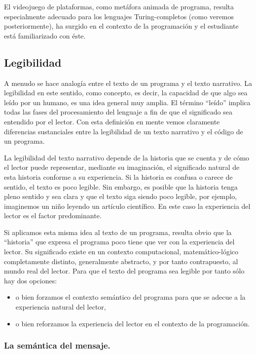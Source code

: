 \documentclass{llncs}
\begin{document}
El videojuego de plataformas, como metáfora animada de programa, resulta especialmente adecuado para los lenguajes Turing-completos (como veremos posteriormente), ha surgido en el contexto de la programación y el estudiante está familiarizado con éste.

\subsection{Legibilidad}
\label{subsec:readability}
A menudo se hace analogía entre el texto de un programa y el texto narrativo. La legibilidad en este sentido, como concepto, es decir, la capacidad de que algo sea leído por un humano, es una idea general muy amplia. El término ``leído'' implica todas las fases del procesamiento del lenguaje a fin de que el significado sea entendido por el lector. Con esta definición en mente vemos claramente diferencias sustanciales entre la legibilidad de un texto narrativo y el código de un programa. 

La legibilidad del texto narrativo depende de la historia que se cuenta y de cómo el lector puede representar, mediante su imaginación, el significado natural de esta historia conforme a su experiencia. Si la historia es confusa o carece de sentido, el texto es poco legible. Sin embargo, es posible que la historia tenga pleno sentido y sea clara y que el texto siga siendo poco legible, por ejemplo, imaginemos un niño leyendo un artículo científico. En este caso la experiencia del lector es el factor predominante. 

Si aplicamos esta misma idea al texto de un programa, resulta obvio que la ``historia'' que expresa el programa poco tiene que ver con la experiencia del lector. Su significado existe en un contexto computacional, matemático-lógico completamente distinto, generalmente abstracto, y por tanto contrapuesto, al mundo real del lector. Para que el texto del programa sea legible por tanto sólo hay dos opciones: 

\begin{itemize}
\item o bien forzamos el contexto semántico del programa para que se adecue a la experiencia natural del lector, 
\item o bien reforzamos la experiencia del lector en el contexto de la programación. 
\end{itemize}

\subsubsection{La semántica del mensaje.}
\label{subsec:message}
\end{document}
